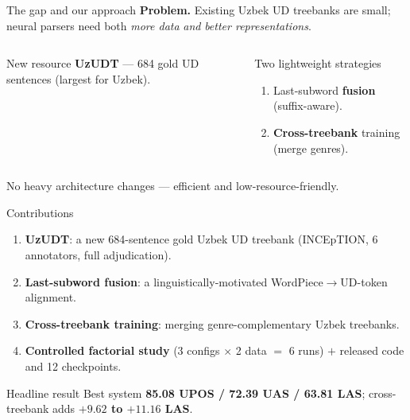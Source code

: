 \documentclass{beamer}
\begin{document}
\begin{frame}{The gap and our approach}
\textbf{Problem.} Existing Uzbek UD treebanks are small; neural parsers
need both \emph{more data} \emph{and} \emph{better representations}.
\vspace{0.35cm}
\begin{columns}[T]
\begin{block}{New resource}
\textbf{UzUDT} --- 684 gold UD sentences (largest for Uzbek).
\end{block}
\begin{block}{Two lightweight strategies}
\begin{enumerate}
  \item Last-subword \textbf{fusion} (suffix-aware).
  \item \textbf{Cross-treebank} training (merge genres).
\end{enumerate}
\end{block}
\end{columns}
\vspace{0.25cm}
\centering\footnotesize
No heavy architecture changes --- efficient and low-resource-friendly.
\end{frame}

\begin{frame}{Contributions}
\begin{enumerate}\setlength\itemsep{4pt}
  \item \textbf{UzUDT}: a new 684-sentence gold Uzbek UD treebank
        (INCEpTION, 6 annotators, full adjudication).
  \item \textbf{Last-subword fusion}: a linguistically-motivated
        WordPiece$\to$UD-token alignment.
  \item \textbf{Cross-treebank training}: merging genre-complementary
        Uzbek treebanks.
  \item \textbf{Controlled factorial study}
        (3 configs $\times$ 2 data $=$ 6 runs) $+$ released code and
        12 checkpoints.
\end{enumerate}
\vspace{0.15cm}
\begin{block}{Headline result}
\centering
Best system \textbf{85.08 UPOS / 72.39 UAS / 63.81 LAS};
cross-treebank adds \textbf{$+9.62$ to $+11.16$ LAS}.
\end{block}
\end{frame}
\end{document}
